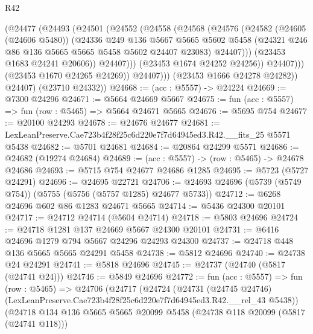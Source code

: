 \begin{lexlean}{R42}
\begin{coremodule}
                      (@24477
                        (@24493
                          (@24501
                            (@24552
                              (@24558
                                (@24568
                                  (@24576
                                    (@24582
                                      (@24605 (@24606 @5480))
                                      (@24336
                                        @249
                                        @136
                                        @5667
                                        @5665
                                        @5602
                                        @5458
                                        (@24321 @246 @86 @136 @5665 @5665 @5458 @5602 @24407 @23083)
                                        @24407)))
                                  (@23453 @1683 @24241 @20606))
                                @24407)))
                          (@23453 @1674 @24252 @24256))
                        @24407)))
                  (@23453 @1670 @24265 @24269))
                @24407)))
          (@23453 @1666 @24278 @24282))
        @24407)
      (@23710 @24332))
@24668 := (acc : @5557) -> @24224
@24669 := @7300 @24296
@24671 := @5664 @24669 @5667
@24675 := fun (acc : @5557) => fun (row : @5465) => @5664 @24671 @5665
@24676 := @5695 @754
@24677 := @20100 @24293
@24678 := @24676 @24677
@24681 := LexLeanPreserve.Cae723b4f28f25c6d220e7f7d64945ed3.R42.__fits_25 @5571 @5438
@24682 := @5701 @24681
@24684 := @20864 @24299 @5571
@24686 := @24682 (@19274 @24684)
@24689 := (acc : @5557) -> (row : @5465) -> @24678 @24686
@24693 := @5715 @754 @24677 @24686 @1285
@24695 := @5723 (@5727 @24291)
@24696 := @24695 @22721
@24706 := @24693 @24696 (@5739 (@5749 @754)) (@5755 (@5756 (@5757 @1285) @24677 @5733))
@24712 := @6268 @24696 @602 @86 @1283 @24671 @5665
@24714 := @5436 @24300 @20101
@24717 := @24712 @24714 (@5604 @24714)
@24718 := @5803 @24696
@24724 := @24718 @1281 @137 @24669 @5667 @24300 @20101
@24731 := @6416 @24696 @1279 @794 @5667 @24296 @24293 @24300
@24737 := @24718 @448 @136 @5665 @5665 @24291 @5458
@24738 := @5812 @24696
@24740 := @24738 @24 @24291
@24741 := @5818 @24696
@24745 := @24737 (@24740 (@5817 (@24741 @24)))
@24746 := @5849 @24696
@24772 := fun (acc : @5557) =>
  fun (row : @5465) =>
  @24706
    (@24717
      (@24724
        (@24731
          (@24745 @24746)
          (LexLeanPreserve.Cae723b4f28f25c6d220e7f7d64945ed3.R42.__rel_43 @5438))
        (@24718
          @134
          @136
          @5665
          @5665
          @20099
          @5458
          (@24738 @118 @20099 (@5817 (@24741 @118)))

\end{coremodule}
\end{lexlean}
